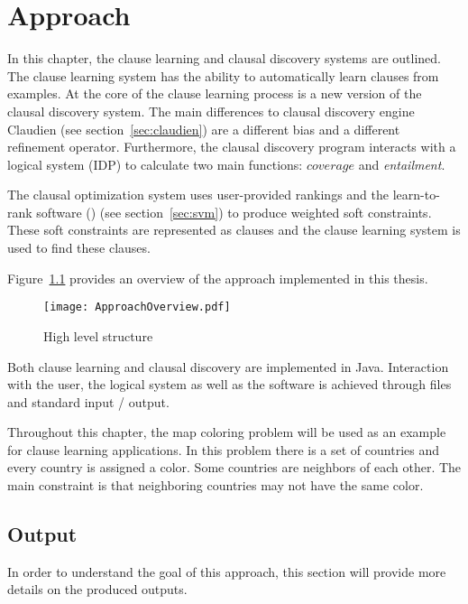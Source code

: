 \chapter{Approach}
\label{cha:meth}

In this chapter, the clause learning and clausal discovery systems are outlined.
The clause learning system has the ability to automatically learn clauses from examples.
At the core of the clause learning process is a new version of the clausal discovery system.
The main differences to clausal discovery engine Claudien (see section~\ref{sec:claudien}) are a different bias and a different refinement operator.
Furthermore, the clausal discovery program interacts with a logical system (IDP) to calculate two main functions: $\mathit{coverage}$ and \textit{entailment}.

The clausal optimization system uses user-provided rankings and the learn-to-rank software (\svm) (see section~\ref{sec:svm}) to produce weighted soft constraints.
These soft constraints are represented as clauses and the clause learning system is used to find these clauses.

Figure~\ref{fig:high_level_structure} provides an overview of the approach implemented in this thesis.

\begin{figure}

	\caption{High level structure}
	\centering
		\texttt{[image: ApproachOverview.pdf]}
	\label{fig:high_level_structure}

\end{figure}

Both clause learning and clausal discovery are implemented in Java.
Interaction with the user, the logical system as well as the  software is achieved through files and standard input / output.

Throughout this chapter, the map coloring problem will be used as an example for clause learning applications.
In this problem there is a set of countries and every country is assigned a color.
Some countries are neighbors of each other.
The main constraint is that neighboring countries may not have the same color.

\section{Output}
In order to understand the goal of this approach, this section will provide more details on the produced outputs.

